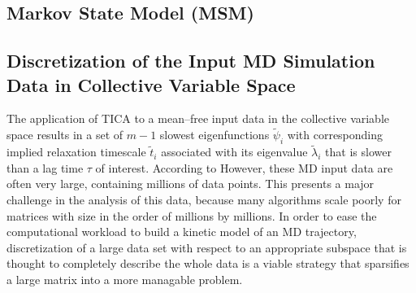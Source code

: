 \begin{spacing}{2.0}
    \section{Markov State Model (MSM)}

    \subsection{Discretization of the Input MD Simulation Data in Collective Variable Space}

    The application of TICA to a mean--free input data in the collective variable space results in a set of $m-1$ slowest eigenfunctions $\tilde{\psi}_i$ 
    with corresponding implied relaxation timescale $\tilde{t}_i$ associated with its eigenvalue $\tilde{\lambda}_i$ that is slower than a lag time
    $\tau$ of interest. According to  However, these MD input data are often very large, containing millions of data points. This
    presents a major challenge in the analysis of this data, because many algorithms scale poorly for matrices with size in the order of millions by
    millions. In order to ease the computational workload to build a kinetic model of an MD trajectory, discretization of a large data set with respect
    to an appropriate subspace that is thought to completely describe the whole data is a viable strategy that sparsifies a large matrix into a more
    managable problem. 
\end{spacing}
